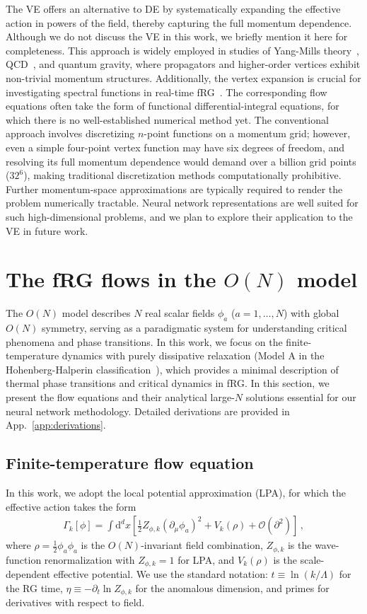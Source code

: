 \documentclass[reprint,twocolumn,superscriptaddress,preprintnumbers,amsmath,amssymb,aps,prd,floatfix]{revtex4-2}
\def\App#1{App.~\ref{#1}}
\begin{document}
The VE offers an alternative to DE by systematically expanding the effective action in powers of the field, thereby capturing the full momentum dependence. Although we do not discuss the VE in this work, we briefly mention it here for completeness. This approach is widely employed in studies of Yang-Mills theory~\cite{Cyrol:2016tym}, QCD~\cite{Fu:2022uow,Fu:2025hcm}, and quantum gravity, where propagators and higher-order vertices exhibit non-trivial momentum structures. Additionally, the vertex expansion is crucial for investigating spectral functions in real-time fRG~\cite{Tan:2021zid}. The corresponding flow equations often take the form of functional differential-integral equations, for which there is no well-established numerical method yet. The conventional approach involves discretizing $n$-point functions on a momentum grid; however, even a simple four-point vertex function may have six degrees of freedom, and resolving its full momentum dependence would demand over a billion grid points ($32^6$), making traditional discretization methods computationally prohibitive. Further momentum-space approximations are typically required to render the problem numerically tractable. Neural network representations are well suited for such high-dimensional problems, and we plan to explore their application to the VE in future work.

\section{The fRG flows in the $O(N)$ model}
\label{sec:ON}
The $O(N)$ model describes $N$ real scalar fields $\phi_a$ ($a = 1, \ldots, N$) with global $O(N)$ symmetry, serving as a paradigmatic system for understanding critical phenomena and phase transitions. In this work, we focus on the finite-temperature dynamics with purely dissipative relaxation (Model A in the Hohenberg-Halperin classification~\cite{Hohenberg:1977ym}), which provides a minimal description of thermal phase transitions and critical dynamics in fRG. In this section, we present the flow equations and their analytical large-$N$ solutions essential for our neural network methodology. Detailed derivations are provided in \App{app:derivations}.

\subsection{Finite-temperature flow equation}
\label{sec:flow_eq}
In this work, we adopt the local potential approximation (LPA), for which the effective action takes the form
\begin{align}
\Gamma_k[\phi]=\int \mathrm{d}^d x\left[\frac{1}{2} Z_{\phi, k}\left(\partial_\mu \phi_a\right)^2+V_k(\rho)+\mathcal{O}(\partial^2)\right]\,,
\end{align}
where $\rho = \frac{1}{2}\phi_a \phi_a$ is the $O(N)$-invariant field combination, $Z_{\phi,k}$ is the wave-function renormalization with $Z_{\phi,k}=1$ for LPA, and $V_k(\rho)$ is the scale-dependent effective potential. We use the standard notation: $t\equiv\ln(k/\Lambda)$ for the RG time, $\eta\equiv-\partial_t\ln Z_{\phi,k}$ for the anomalous dimension, and primes for derivatives with respect to field.
\end{document}

